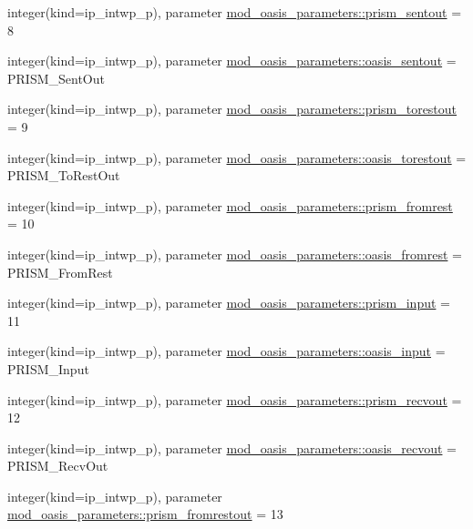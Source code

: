 \begin{DoxyCompactItemize}
\item 
integer(kind=ip\+\_\+intwp\+\_\+p), parameter \hyperlink{namespacemod__oasis__parameters_a9f683811203a8cf60704b4938a8f3a11}{mod\+\_\+oasis\+\_\+parameters\+::prism\+\_\+sentout} = 8
\item 
integer(kind=ip\+\_\+intwp\+\_\+p), parameter \hyperlink{namespacemod__oasis__parameters_a1804e9b27d8d7ace38fd4c3f99ade6dd}{mod\+\_\+oasis\+\_\+parameters\+::oasis\+\_\+sentout} = P\+R\+I\+S\+M\+\_\+\+Sent\+Out
\item 
integer(kind=ip\+\_\+intwp\+\_\+p), parameter \hyperlink{namespacemod__oasis__parameters_a9ed7a0f0a9392248de5b4b15849843df}{mod\+\_\+oasis\+\_\+parameters\+::prism\+\_\+torestout} = 9
\item 
integer(kind=ip\+\_\+intwp\+\_\+p), parameter \hyperlink{namespacemod__oasis__parameters_a390018877602efede436bd0721add299}{mod\+\_\+oasis\+\_\+parameters\+::oasis\+\_\+torestout} = P\+R\+I\+S\+M\+\_\+\+To\+Rest\+Out
\item 
integer(kind=ip\+\_\+intwp\+\_\+p), parameter \hyperlink{namespacemod__oasis__parameters_ad77e6f35280cf4e306f818f9ec815441}{mod\+\_\+oasis\+\_\+parameters\+::prism\+\_\+fromrest} = 10
\item 
integer(kind=ip\+\_\+intwp\+\_\+p), parameter \hyperlink{namespacemod__oasis__parameters_aa0584909970d34364b7ec319292b1682}{mod\+\_\+oasis\+\_\+parameters\+::oasis\+\_\+fromrest} = P\+R\+I\+S\+M\+\_\+\+From\+Rest
\item 
integer(kind=ip\+\_\+intwp\+\_\+p), parameter \hyperlink{namespacemod__oasis__parameters_aa9009f13473f2cb6476c2fb5e4963243}{mod\+\_\+oasis\+\_\+parameters\+::prism\+\_\+input} = 11
\item 
integer(kind=ip\+\_\+intwp\+\_\+p), parameter \hyperlink{namespacemod__oasis__parameters_ae65ca856d776de249fc624b2d76bc4e8}{mod\+\_\+oasis\+\_\+parameters\+::oasis\+\_\+input} = P\+R\+I\+S\+M\+\_\+\+Input
\item 
integer(kind=ip\+\_\+intwp\+\_\+p), parameter \hyperlink{namespacemod__oasis__parameters_ab56f2573ea7fd626f24e42606f4745a2}{mod\+\_\+oasis\+\_\+parameters\+::prism\+\_\+recvout} = 12
\item 
integer(kind=ip\+\_\+intwp\+\_\+p), parameter \hyperlink{namespacemod__oasis__parameters_ac7406e7f558491599acfbb6f4628f811}{mod\+\_\+oasis\+\_\+parameters\+::oasis\+\_\+recvout} = P\+R\+I\+S\+M\+\_\+\+Recv\+Out
\item 
integer(kind=ip\+\_\+intwp\+\_\+p), parameter \hyperlink{namespacemod__oasis__parameters_ac989a8af875dd1765b1369814fd4eb9d}{mod\+\_\+oasis\+\_\+parameters\+::prism\+\_\+fromrestout} = 13

\end{DoxyCompactItemize}
